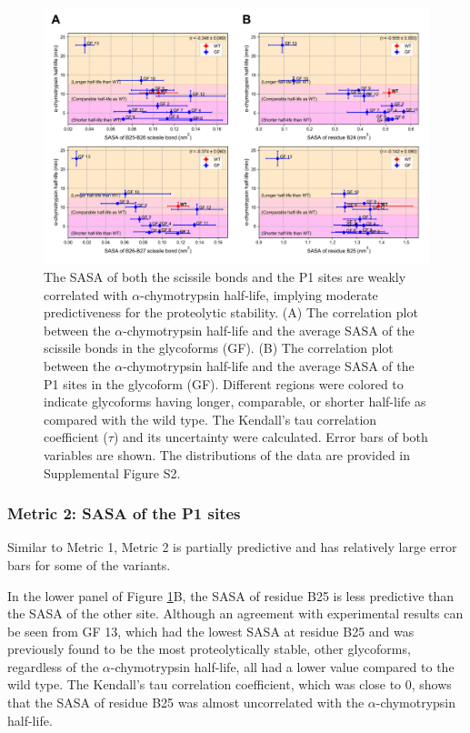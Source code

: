 \documentclass[sn-vancouver]{sn-jnl}
\begin{document}
\begin{figure}[H]
\centering
\includegraphics[width=\textwidth]{Figures/Fig_SASA_correlation.png}
\caption{The SASA of both the scissile bonds and the P1 sites are weakly correlated with $\alpha$-chymotrypsin half-life, implying moderate predictiveness for the proteolytic stability. (A) The correlation plot between the $\alpha$-chymotrypsin half-life and the average SASA of the scissile bonds in the glycoforms (GF). (B) The correlation plot between the $\alpha$-chymotrypsin half-life and the average SASA of the P1 sites in the glycoform (GF). Different regions were colored to indicate glycoforms having longer, comparable, or shorter half-life as compared with the wild type. The Kendall's tau correlation coefficient ($\tau$) and its uncertainty were calculated. Error bars of both variables are shown. The distributions of the data are provided in Supplemental Figure S2.}
\label{result_sasa}
\end{figure}

\subsubsection*{Metric 2: SASA of the P1 sites}
Similar to Metric 1, Metric 2 is partially predictive and has relatively large error bars for some of the variants. 

In the lower panel of Figure \ref{result_sasa}B, the SASA of residue B25 is less predictive than the SASA of the other site. Although an agreement with experimental results can be seen from GF 13, which had the lowest SASA at residue B25 and was previously found to be the most proteolytically stable, other glycoforms, regardless of the $\alpha$-chymotrypsin half-life, all had a lower value compared to the wild type. The Kendall's tau correlation coefficient, which was close to 0, shows that the SASA of residue B25 was almost uncorrelated with the $\alpha$-chymotrypsin half-life. 
\end{document}
